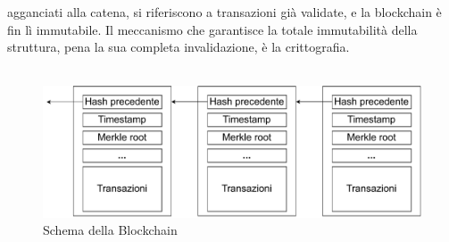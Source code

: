 agganciati alla catena, si riferiscono a transazioni già validate, e la blockchain è fin lì immutabile. Il meccanismo che garantisce la totale immutabilità della struttura, pena la sua completa invalidazione, è la crittografia.\\\\
\begin{figure}[h!]
    \centering
    \includegraphics[scale=0.6]{Images/blockChaining.pdf}
    \caption{Schema della Blockchain}
    \label{fig:blockchain}
\end{figure}
\FloatBarrier
